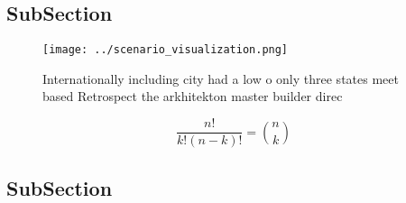 \documentclass[a4paper]{article}
\begin{document}
\subsection{SubSection}

\begin{figure}
\centering
\texttt{[image: ../scenario\_visualization.png]}
\caption{Internationally including city had a low o only three states meet based Retrospect the arkhitekton master builder direc
}
\end{figure}
 
\[ \frac{n!}{k!(n-k)!} = \binom{n}{k} \]

\subsection{SubSection}
\end{document}
